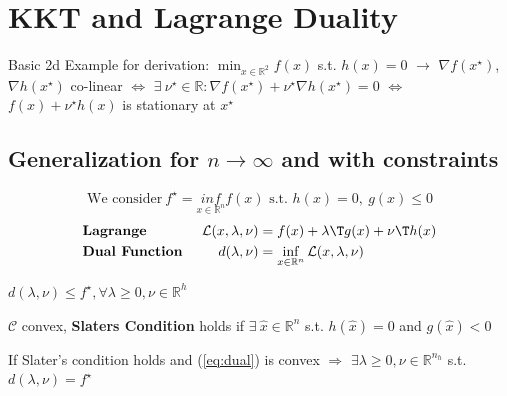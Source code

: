 \section{KKT and Lagrange Duality}

Basic 2d Example for derivation:
$\min _{x \in \mathbb{R}^2} f(x)$ s.t. $h(x)=0$
$\rightarrow$
$\nabla f(x^\star)$, $\nabla h(x^\star)$
co-linear
$\Leftrightarrow$
$\exists\ \nu^\star \in \mathbb{R}: \nabla f(x^\star)+\nu^\star\nabla h(x^\star) = 0$
$\Leftrightarrow$
$f(x)+\nu^\star h(x)$ is stationary at $x^\star$

\subsection{Generalization for $n\rightarrow\infty$ and with constraints}
\vspace{-4mm}
\begin{equation}
	\text{We consider}\
	f^\star = \underset{x \in \mathcal{\mathbb{R}}^n}{inf}f(x) \text{ s.t. } h(x)=0,\ g(x) \le 0
	\label{eq:dual}
\end{equation}
\vspace{-2mm}
$$\begin{aligned}
		                           & \textbf{Lagrange }                                              &
		\mathcal{L}(x,\lambda,\nu) & = f(x) + \lambda\T g(x)+\nu\T h(x)
		\\
		                           & \textbf{Dual Function }                                         &
		d(\lambda,\nu)             & = \inf_{x \in \mathcal{\mathbb{R}}^n}\mathcal{L}(x,\lambda,\nu)
	\end{aligned}$$
\begin{proposition}
	$d(\lambda,\nu)\le f^\star,\forall\lambda\ge0,\nu\in\mathbb{R}^{h}$
\end{proposition}

\begin{definition}
	$\mathcal{C}$ convex, \textbf{Slaters Condition} holds if
	$\exists\ \hat{x} \in \mathbb{R}^{n}$ s.t. $h(\hat{x})=0$ and $g(\hat{x})<0$
\end{definition}

\begin{proposition}
	If Slater's condition holds
	and (\ref{eq:dual}) is convex
	$\Rightarrow$
	$\exists \lambda \ge 0, \nu \in \mathbb{R}^{n_h}$ s.t. $d(\lambda,\nu)=f^\star$
\end{proposition}


